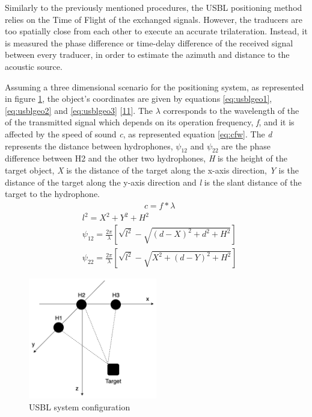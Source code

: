 Similarly to the previously mentioned procedures, the USBL positioning method relies on the Time of Flight of the exchanged signals. However, the traducers are too spatially close from each other to execute an accurate trilateration. Instead, it is measured the phase difference or time-delay difference of the received signal between every traducer, in order to estimate the azimuth and distance to the acoustic source. 

Assuming a three dimensional scenario for the positioning system, as represented in figure \ref{fig:usblgeo}, the object's coordinates are given by equations \ref{eq:usblgeo1}, \ref{eq:usblgeo2} and \ref{eq:usblgeo3} [\hyperref[r:usbl-new]{11}]. The $\lambda$ corresponds to the wavelength of the of the transmitted signal which depends on its operation frequency, \textit{f}, and it is affected by the speed of sound \textit{c}, as represented equation \ref{eq:cfw}.
The \textit{d} represents the distance between hydrophones, $\psi_{12}$ and $\psi_{22}$ are the phase difference between H2 and the other two hydrophones, \textit{H} is the height of the target object, \textit{X} is the distance of the target along the x-axis direction, \textit{Y} is the distance of the target along the y-axis direction and \textit{l} is the slant distance of the target to the hydrophone.
\begin{eqnarray}
& c = f * \lambda
\label{eq:cfw}
\end{eqnarray}
\begin{eqnarray}
& l^2 = X^2 + Y^2 + H^2 
\label{eq:usblgeo1}\\
& \psi_{12} = \frac{2\pi}{\lambda}[\sqrt{l^2} - \sqrt{(d-X)^2 + d^2 + H^2}]
\label{eq:usblgeo2}\\
& \psi_{22} = \frac{2\pi}{\lambda}[\sqrt{l^2} - \sqrt{X^2 + (d-Y)^2 + H^2}]
\label{eq:usblgeo3}
\end{eqnarray}

\begin{figure}[!htbp]
	\centering
	\includegraphics[width=0.5\textwidth]{figures/usbl-config}
	\caption{USBL system configuration}
	\label{fig:usblgeo}
\end{figure}

